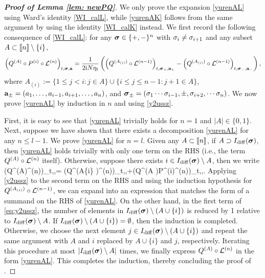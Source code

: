 \begin{proof}[\bf Proof of Lemma \ref{lem: newPQ}] %
We only prove the expansion \eqref{yurenAL} using Ward's identity \eqref{WI_calL}, while \eqref{yurenAK} follows from the same argument by using the identity \eqref{WI_calK} instead. 
We first record the following consequence of \eqref{WI_calL}: for any $\bsig\in \{+,-\}^n$ with $\sig_i\ne \sig_{i+1}$ and any subset $A\subset \qqq{n}\setminus\{i\}$, %
\begin{align}\label{y2ussz}
\left(Q^{(A)} \circ P^{(i)}\circ {\cal L}^{(n)}\right)_{t,\bsig,\ba}
= \frac{1}{ 2\ii N\eta_t}
\left(\left(Q^{(A_{(i)})} \circ {\cal L}^{(n-1)}\right)_{t,\bsig_+,\ba_+}- \left(Q^{(A_{(i)})}\circ {\cal L}^{(n-1)}\right)_{t,\bsig_-,\ba_-}\right), 
\end{align}
where $A_{(i)}:=\{1\le j<i: j\in A\} \cup \{i\le j\le n-1: j+1\in A\}$, $\ba_\pm = (a_1,\ldots, a_{i-1}, a_{i+1},\ldots, a_n)$, and $\bsig_\pm = (\sigma_1\cdots \sigma_{i-1}, \pm, \sigma_{i+2},\cdots \sigma_n)$. 
We now prove \eqref{yurenAL} by induction in $n$ and using \eqref{y2ussz}. 

First, it is easy to see that \eqref{yurenAL} trivially holds for $n=1$ and $|A|\in\{0,1\}$. 
Next, suppose we have shown that there exists a decomposition \eqref{yurenAL} for any $n\le l-1$. We prove \eqref{yurenAL} for $n=l$. Given any $A\subset\qqq{n}$, if $A\supset I_{\mathrm{diff}}(\bsig)$, then \eqref{yurenAL} holds trivially with only one term on the RHS (i.e., the term $Q^{(A)}\circ {\cal L}^{(n)}$ itself). Otherwise, suppose there exists $i\in I_{\mathrm{diff}}(\bsig)\setminus A$, then we write
\be\label{eq:y2ussz}
 \left(Q^{(A)}^{(n)}\right)_{t,\bsig,\ba}= \left(Q^{(A\cup \{i\} )}^{(n)}\right)_{t,\ba,\bsig}+\left(Q^{(A )}\circ P^{(i)}^{(n)}\right)_{t,\bsig,\ba}. 
 \ee
Applying \eqref{y2ussz} to the second term on the RHS and using the induction hypothesis for $Q^{(A_{(i)})} \circ {\cal L}^{(n-1)}$, we can expand  into an expression that matches the form of a summand on the RHS of \eqref{yurenAL}. 
On the other hand, in the first term of \eqref{eq:y2ussz}, the number of elements in $I_{\mathrm{diff}}(\bsig)\setminus (A\cup\{i\})$ is reduced by 1 relative to $I_{\mathrm{diff}}(\bsig)\setminus A$. If $I_{\mathrm{diff}}(\bsig)\setminus (A\cup\{i\})=\emptyset$, then the induction is completed. Otherwise, we choose the next element $j\in I_{\mathrm{diff}}(\bsig)\setminus (A\cup\{i\})$ and repeat the same argument with $A$ and $i$ replaced by $A\cup\{i\}$ and $j$, respectively. Iterating this procedure at most $|I_{\mathrm{diff}}(\bsig)\setminus A|$ times, we finally express $Q^{(A)}\circ {\cal L}^{(n)}$ in the form \eqref{yurenAL}. This completes the induction, thereby concluding the proof of . 
\end{proof}


